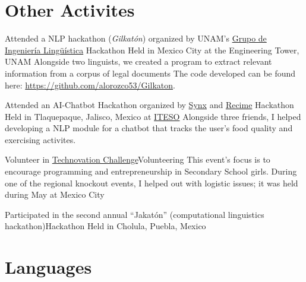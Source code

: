 \documentclass[11pt,a4paper,sans]{moderncv} %
\begin{document}
\section{Other Activites}

        {Attended a NLP hackathon (\emph{Gilkatón}) organized by UNAM's
          \href{http://grupos.iingen.unam.mx/iling/es-mx/Paginas/default.aspx}{Grupo de Ingeniería Lingüística}}
        {Hackathon}
        {Held in Mexico City at the Engineering Tower, UNAM}
        {Alongside two linguists, we created a program to extract relevant information
          from a corpus of legal documents}
        {The code developed can be found here: \url{https://github.com/alorozco53/Gilkaton}.}

        {Attended an AI-Chatbot Hackathon organized by \href{http://synx.co}{Synx} and \href{https://www.recime.io}{Recime}}
        {Hackathon}
        {Held in Tlaquepaque, Jalisco, Mexico at \href{http://www.iteso.mx}{ITESO}}{}
        {Alongside three friends, I helped developing a NLP module for a chatbot that tracks the user's food quality and exercising activites.}

        {Volunteer in \href{http://technovationmx.org}{Technovation Challenge}}{Volunteering}
        {This event's focus is to encourage programming and entrepreneurship in Secondary School girls. During one of the regional knockout events, I helped out with logistic issues; it was held during May at Mexico City}
        {}{}

        {Participated in the second annual ``Jakatón'' (computational linguistics hackathon)}{Hackathon}
        {Held in Cholula, Puebla, Mexico}{}{}




\section{Languages}

\end{document}
